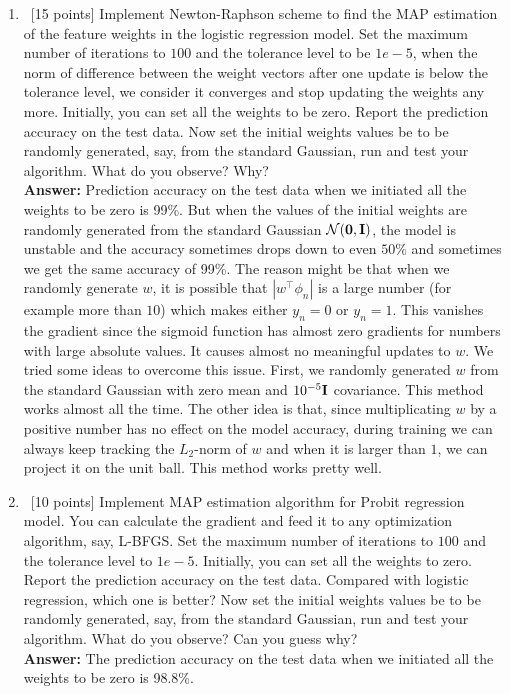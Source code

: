 \documentclass[12pt, fullpage,letterpaper]{article}
\def\red{\color{red}}
\def\blackblue{\color{black!40!blue}}
\begin{document}
\begin{enumerate}
\begin{enumerate}
	\item~[15 points] Implement Newton-Raphson scheme to find the MAP estimation of the feature weights in the logistic regression model. Set the maximum number of iterations to $100$ and the tolerance level to be $1e-5$,  \ie when the norm of difference between the weight vectors after one update is below the tolerance level, we consider it converges and stop updating the weights any more. Initially, you can set all the weights to be zero. Report the prediction accuracy on the test data. Now set the initial weights values be to be randomly generated, say, from the standard Gaussian, run and test your algorithm. What do you observe? Why? \\
	{\bf \red Answer:} {\blackblue 
	Prediction accuracy on the test data when we initiated all the weights to be zero is 99\%.
	 But when the values of the initial weights are randomly generated from the standard Gaussian $\mathcal{N}({\bf 0}, {\bf I})$, the model is unstable and the accuracy sometimes drops down to even $50\%$ and sometimes we get the same accuracy of 99\%. The reason might be that when we randomly generate $w$, it is possible that $|w^\top\phi_n |$ is a large number (for example more than $10$) which makes either $y_n =0$ or $y_n= 1$. This vanishes the gradient since the sigmoid function has almost zero gradients for numbers with large absolute values. It causes almost no meaningful updates to $w$.  We tried some ideas to overcome this issue. First, we randomly generated $w$ from the standard Gaussian with zero mean and $10^{-5}{\bf I}$ covariance. This method works almost all the time. The other idea is that, since multiplicating $w$ by a positive number has no effect on the model accuracy, during training we can always keep tracking the $L_2$-norm of $w$ and when it is larger than $1$, we can project it on the unit ball.  This method works pretty well.
}
	\item~[10 points]  Implement MAP estimation algorithm for Probit regression model. You can calculate the gradient and feed it to any optimization algorithm, say, L-BFGS. Set the maximum number of iterations to $100$ and the tolerance level to $1e-5$. Initially, you can set all the weights to zero. Report the prediction accuracy  on the test data. Compared with logistic regression, which one is better? 
	Now set the initial weights values be to be randomly generated, say, from the standard Gaussian, run and test your algorithm. What do you observe? Can you guess why?  \\
	{\bf \red Answer:} {\blackblue 
	The prediction accuracy on the test data when we initiated all the weights to be zero is 98.8\%. 
}
\end{enumerate}
\end{enumerate}
\end{document}
